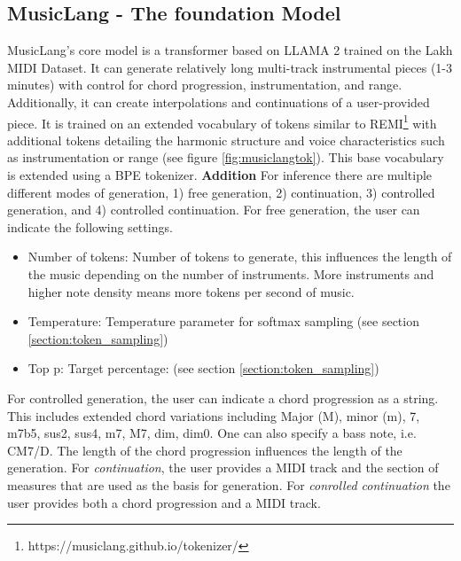 \subsection{MusicLang - The foundation Model}
MusicLang's core model is a transformer based on LLAMA 2 trained on the Lakh MIDI Dataset\cite{Raffel_2016}. It can generate relatively long multi-track instrumental pieces (1-3 minutes) with control for chord progression, instrumentation, and range. Additionally, it can create interpolations and continuations of a user-provided piece. It is trained on an extended vocabulary of tokens similar to REMI\footnote{https://musiclang.github.io/tokenizer/} with additional tokens detailing the harmonic structure and voice characteristics such as instrumentation or range (see figure \ref{fig:musiclangtok}). This base vocabulary is extended using a BPE tokenizer. 
\textbf{Addition} For inference there are multiple different modes of generation, 1) free generation, 2) continuation, 3) controlled generation, and 4) controlled continuation. For free generation, the user can indicate the following settings.
\begin{itemize}
    \item Number of tokens: Number of tokens to generate, this influences the length of the music depending on the number of instruments. More instruments and higher note density means more tokens per second of music.
    \item Temperature: Temperature parameter for softmax sampling (see section \ref{section:token_sampling})
    \item Top p: Target percentage: (see section \ref{section:token_sampling}) 
\end{itemize}
For controlled generation, the user can indicate a chord progression as a string. This includes extended chord variations including Major (M), minor (m), 7, m7b5, sus2, sus4, m7, M7, dim, dim0. One can also specify a bass note, i.e. CM7/D. The length of the chord progression influences the length of the generation.
For \textit{continuation}, the user provides a MIDI track and the section of measures that are used as the basis for generation.
For \textit{conrolled continuation} the user provides both a chord progression and a MIDI track. 

